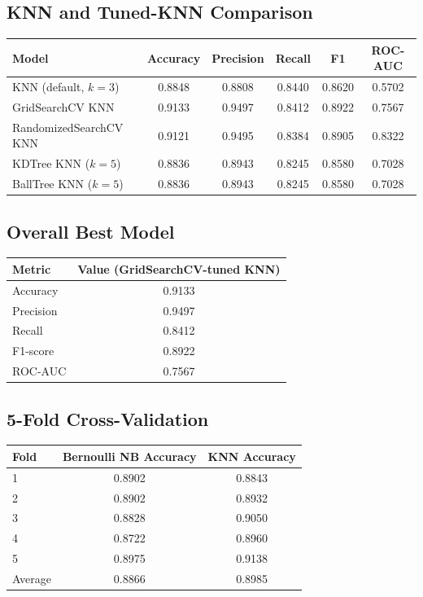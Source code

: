 \documentclass[12pt,a4paper]{article}
\begin{document}
\subsection*{KNN and Tuned-KNN Comparison}
\begin{tabular}{lccccc}
\toprule
Model & Accuracy & Precision & Recall & F1 & ROC-AUC \\
\midrule
KNN (default, $k=3$) & 0.8848 & 0.8808 & 0.8440 & 0.8620 & 0.5702 \\
GridSearchCV KNN & 0.9133 & 0.9497 & 0.8412 & 0.8922 & 0.7567 \\
RandomizedSearchCV KNN & 0.9121 & 0.9495 & 0.8384 & 0.8905 & 0.8322 \\
KDTree KNN ($k=5$) & 0.8836 & 0.8943 & 0.8245 & 0.8580 & 0.7028 \\
BallTree KNN ($k=5$) & 0.8836 & 0.8943 & 0.8245 & 0.8580 & 0.7028 \\
\bottomrule
\end{tabular}

\subsection*{Overall Best Model}
\begin{tabular}{lc}
\toprule
Metric & Value (GridSearchCV-tuned KNN)\\
\midrule
Accuracy & 0.9133 \\
Precision & 0.9497 \\
Recall & 0.8412 \\
F1-score & 0.8922 \\
ROC-AUC & 0.7567 \\
\bottomrule
\end{tabular}

\subsection*{5-Fold Cross-Validation}
\begin{tabular}{lcc}
\toprule
Fold & Bernoulli NB Accuracy & KNN Accuracy \\
\midrule
1 & 0.8902 & 0.8843 \\
2 & 0.8902 & 0.8932 \\
3 & 0.8828 & 0.9050 \\
4 & 0.8722 & 0.8960 \\
5 & 0.8975 & 0.9138 \\
\midrule
Average & 0.8866 & 0.8985 \\
\bottomrule
\end{tabular}
\end{document}
